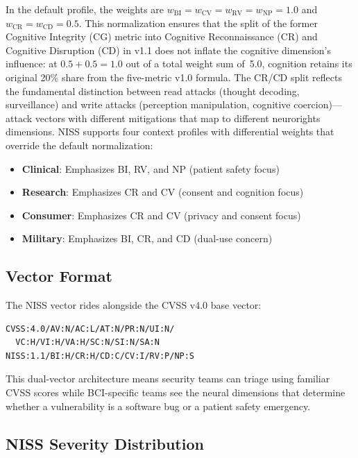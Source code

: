 In the default profile, the weights are $w_{\text{BI}} = w_{\text{CV}} =
w_{\text{RV}} = w_{\text{NP}} = 1.0$ and $w_{\text{CR}} = w_{\text{CD}} = 0.5$.
This normalization ensures that the split of the former Cognitive Integrity (CG)
metric into Cognitive Reconnaissance (CR) and Cognitive Disruption (CD) in v1.1
does not inflate the cognitive dimension's influence: at $0.5 + 0.5 = 1.0$ out of
a total weight sum of~5.0, cognition retains its original 20\% share from the
five-metric v1.0 formula. The CR/CD split reflects the fundamental distinction
between read attacks (thought decoding, surveillance) and write attacks
(perception manipulation, cognitive coercion)---attack vectors with different
mitigations that map to different neurorights dimensions.
NISS supports four context profiles with differential weights that override
the default normalization:

\begin{itemize}
  \item \textbf{Clinical}: Emphasizes BI, RV, and NP (patient safety focus)
  \item \textbf{Research}: Emphasizes CR and CV (consent and cognition focus)
  \item \textbf{Consumer}: Emphasizes CR and CV (privacy and consent focus)
  \item \textbf{Military}: Emphasizes BI, CR, and CD (dual-use concern)
\end{itemize}

\subsection{Vector Format}

The NISS vector rides alongside the CVSS v4.0 base vector:

\begin{lstlisting}
CVSS:4.0/AV:N/AC:L/AT:N/PR:N/UI:N/
  VC:H/VI:H/VA:H/SC:N/SI:N/SA:N
NISS:1.1/BI:H/CR:H/CD:C/CV:I/RV:P/NP:S
\end{lstlisting}

This dual-vector architecture means security teams can triage using familiar CVSS
scores while BCI-specific teams see the neural dimensions that determine whether a
vulnerability is a software bug or a patient safety emergency.

\subsection{NISS Severity Distribution}

